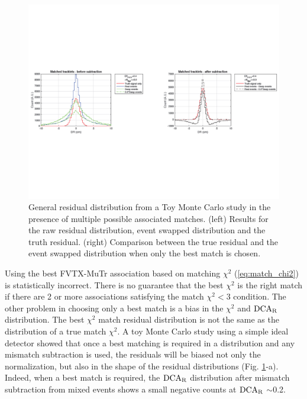 \documentclass[12pt]{article}
\newcommand{\dcar}{$\rm{DCA}_{R}$ }
\begin{document}
\begin{figure}[!htb]
	\includegraphics[width=1.0\textwidth]{Figures/swapp_bias}	
	\caption{\label{fig:toy_model_match} General residual distribution from a Toy Monte Carlo study in the presence of multiple possible associated matches. 
	(left) Results for the raw residual distribution, event swapped distribution and the truth residual. 
	(right) Comparison between the true residual and the event swapped distribution when only the best match is chosen.}
\end{figure}

Using the best FVTX-MuTr association based on matching $\chi^2$ (\ref{eq:match_chi2}) is statistically incorrect. There is no guarantee 
that the best $\chi^2$ is the right match if there are 2 or more associations satisfying the match $\chi^2<3$ condition. 
The other problem in choosing only a best match is a bias in the $\chi^2$ and \dcar distribution. The best $\chi^2$ match 
residual distribution is not the same as the distribution of a true match $\chi^2$. A toy Monte Carlo study using a simple ideal detector 
showed that once a best matching is required in a distribution and any mismatch subtraction is used, the residuals will be biased not only 
 the normalization, but also in the shape of the residual distributions (Fig. \ref{fig:toy_model_match}-a). Indeed, when a best match is required, 
 the \dcar distribution after mismatch subtraction from mixed events shows a small negative counts at \dcar$\sim$0.2.
\end{document}
